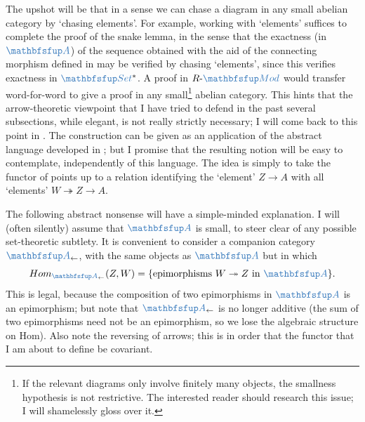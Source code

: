 The upshot will be that in a sense we can chase a diagram in any small
abelian category by `chasing elements'. For example, working with
`elements' suffices to complete the proof of the snake lemma, in the
sense that the exactness (in $\categ{A}$) of the sequence obtained
with the aid of the connecting morphism defined in
 may be verified by
chasing `elements', since this verifies exactness in
$\categ{Set}^*$. A proof in $R\text{-}\categ{Mod}$ would transfer
word-for-word to give a proof in any small\footnote{If the relevant
  diagrams only involve finitely many objects, the smallness
  hypothesis is not restrictive. The interested reader should research
  this issue; I will shamelessly gloss over it.} abelian
category. This hints that the arrow-theoretic viewpoint that I have
tried to defend in the past several subsections, while elegant, is not
really strictly necessary; I will come back to this point in
.  The construction can be given
as an application of the abstract language developed in
; but I promise that the
resulting notion will be easy to contemplate, independently of this
language.  The idea is simply to take the functor of points up to a
relation identifying the `element' $Z \to A$ with all `elements'
$W \twoheadrightarrow Z \to A$.

The following abstract nonsense will have a simple-minded explanation.
I will (often silently) assume that $\categ{A}$ is small, to steer
clear of any possible set-theoretic subtlety. It is convenient to
consider a companion category $\categ{A}_{\leftarrow}$, with the same
objects as $\categ{A}$ but in which
\[
  \Hom_{\categ{A}_{\leftarrow}}(Z,W) = \{\text{epimorphisms } W
  \twoheadrightarrow Z \text{ in } \categ{A}\}.
\]
This is legal, because the composition of two epimorphisms in
$\categ{A}$ is an epimorphism; but note that $\categ{A}_{\leftarrow}$
is no longer additive (the sum of two epimorphisms need not be an
epimorphism, so we lose the algebraic structure on Hom). Also note the
reversing of arrows; this is in order that the functor that I am about
to define be covariant.


